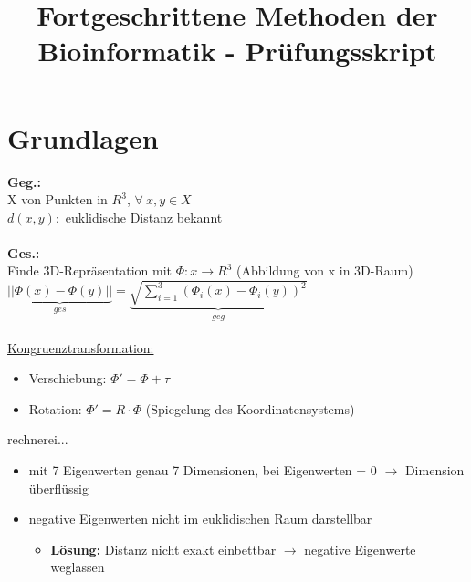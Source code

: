 \documentclass[12pt,a4paper]{article}
\title{\Huge\textbf{Fortgeschrittene Methoden der Bioinformatik - Prüfungsskript}}
\author{}
\date{}
\begin{document}
\begin{titlepage}

\maketitle
\thispagestyle{empty}
\end{titlepage}
\newpage

\begin{titlepage}
\tableofcontents
\thispagestyle{empty}
\end{titlepage}

\section{Grundlagen}
\textbf{Geg.:}\\
X von Punkten in $R^3$, $\forall\ x,y \in X$\\
$d(x,y):$ euklidische Distanz bekannt
\\\\
\textbf{Ges.:}\\
Finde 3D-Repräsentation mit $\Phi: x \rightarrow R^3$ (Abbildung von x in 3D-Raum)\\
$\underbrace{||\Phi(x)-\Phi(y)||}_{ges} = \underbrace{\sqrt{\sum \limits_{i=1}^{3} (\Phi_{i}(x)-\Phi_{i}(y))^2}}_{geg}$\\
\\
\underline{Kongruenztransformation:}
\begin{itemize}
	\item Verschiebung: $\Phi'=\Phi+\tau$
	\item Rotation: $\Phi'=R\cdot\Phi$ (Spiegelung des Koordinatensystems)
\end{itemize}

rechnerei...

\begin{itemize}
	\item mit 7 Eigenwerten genau 7 Dimensionen, bei Eigenwerten = 0 $\rightarrow$ Dimension überflüssig
	\item negative Eigenwerten nicht im euklidischen Raum darstellbar
	\begin{itemize}
		\item \textbf{Lösung:} Distanz nicht exakt einbettbar $\rightarrow$ negative Eigenwerte weglassen
	\end{itemize}
\end{itemize}
\end{document}
